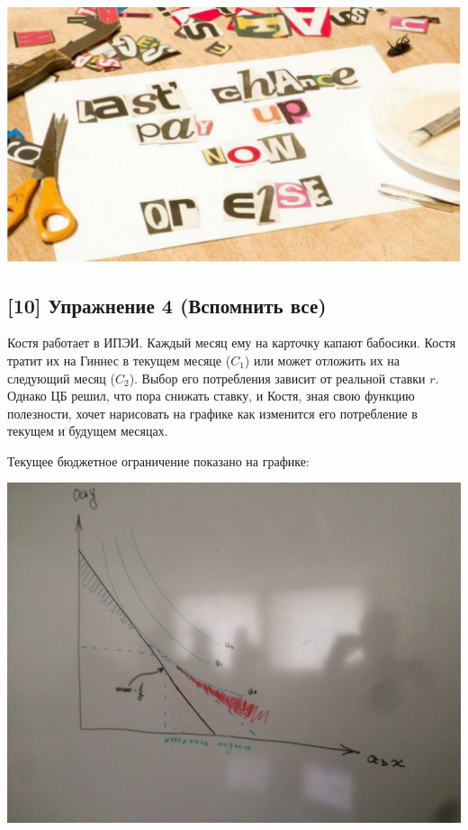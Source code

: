 \documentclass[12pt, a4paper, oneside]{article}
\begin{document}
\begin{center}
\includegraphics[scale=0.2]{letters.png}
\end{center} 

\newpage 

\subsection*{[10]  Упражнение 4 (Вспомнить все)}

Костя работает в ИПЭИ. Каждый месяц ему на карточку капают бабосики. Костя тратит их на Гиннес в текущем месяце ($C_1$) или может отложить их на следующий месяц ($C_2$). Выбор его потребления зависит от реальной ставки $r$. Однако ЦБ решил, что пора снижать ставку, и Костя, зная свою функцию полезности, хочет нарисовать на графике как изменится его потребление в текущем и будущем месяцах.  

Текущее бюджетное ограничение показано на графике: 

\begin{center}
	\includegraphics[scale=0.18]{buogr.jpg}
\end{center} 
\end{document}
